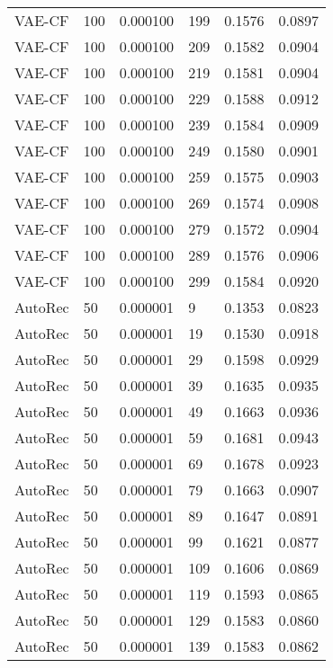 \begin{tabular}{llrlrr}
  VAE-CF &  100 &  0.000100 &   199 &  0.1576 &       0.0897 \\
  VAE-CF &  100 &  0.000100 &   209 &  0.1582 &       0.0904 \\
  VAE-CF &  100 &  0.000100 &   219 &  0.1581 &       0.0904 \\
  VAE-CF &  100 &  0.000100 &   229 &  0.1588 &       0.0912 \\
  VAE-CF &  100 &  0.000100 &   239 &  0.1584 &       0.0909 \\
  VAE-CF &  100 &  0.000100 &   249 &  0.1580 &       0.0901 \\
  VAE-CF &  100 &  0.000100 &   259 &  0.1575 &       0.0903 \\
  VAE-CF &  100 &  0.000100 &   269 &  0.1574 &       0.0908 \\
  VAE-CF &  100 &  0.000100 &   279 &  0.1572 &       0.0904 \\
  VAE-CF &  100 &  0.000100 &   289 &  0.1576 &       0.0906 \\
  VAE-CF &  100 &  0.000100 &   299 &  0.1584 &       0.0920 \\
 AutoRec &   50 &  0.000001 &     9 &  0.1353 &       0.0823 \\
 AutoRec &   50 &  0.000001 &    19 &  0.1530 &       0.0918 \\
 AutoRec &   50 &  0.000001 &    29 &  0.1598 &       0.0929 \\
 AutoRec &   50 &  0.000001 &    39 &  0.1635 &       0.0935 \\
 AutoRec &   50 &  0.000001 &    49 &  0.1663 &       0.0936 \\
 AutoRec &   50 &  0.000001 &    59 &  0.1681 &       0.0943 \\
 AutoRec &   50 &  0.000001 &    69 &  0.1678 &       0.0923 \\
 AutoRec &   50 &  0.000001 &    79 &  0.1663 &       0.0907 \\
 AutoRec &   50 &  0.000001 &    89 &  0.1647 &       0.0891 \\
 AutoRec &   50 &  0.000001 &    99 &  0.1621 &       0.0877 \\
 AutoRec &   50 &  0.000001 &   109 &  0.1606 &       0.0869 \\
 AutoRec &   50 &  0.000001 &   119 &  0.1593 &       0.0865 \\
 AutoRec &   50 &  0.000001 &   129 &  0.1583 &       0.0860 \\
 AutoRec &   50 &  0.000001 &   139 &  0.1583 &       0.0862 \\

\end{tabular}
